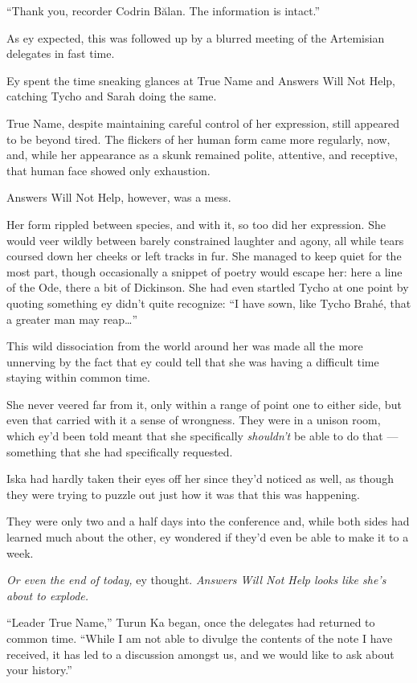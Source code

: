 ``Thank you, recorder Codrin Bălan. The information is intact.''

As ey expected, this was followed up by a blurred meeting of the Artemisian delegates in fast time.

Ey spent the time sneaking glances at True Name and Answers Will Not Help, catching Tycho and Sarah doing the same.

True Name, despite maintaining careful control of her expression, still appeared to be beyond tired. The flickers of her human form came more regularly, now, and, while her appearance as a skunk remained polite, attentive, and receptive, that human face showed only exhaustion.

Answers Will Not Help, however, was a mess.

Her form rippled between species, and with it, so too did her expression. She would veer wildly between barely constrained laughter and agony, all while tears coursed down her cheeks or left tracks in fur. She managed to keep quiet for the most part, though occasionally a snippet of poetry would escape her: here a line of the Ode, there a bit of Dickinson. She had even startled Tycho at one point by quoting something ey didn't quite recognize: ``I have sown, like Tycho Brahé, that a greater man may reap\ldots{}''

This wild dissociation from the world around her was made all the more unnerving by the fact that ey could tell that she was having a difficult time staying within common time.

She never veered far from it, only within a range of point one to either side, but even that carried with it a sense of wrongness. They were in a unison room, which ey'd been told meant that she specifically \emph{shouldn't} be able to do that — something that she had specifically requested.

Iska had hardly taken their eyes off her since they'd noticed as well, as though they were trying to puzzle out just how it was that this was happening.

They were only two and a half days into the conference and, while both sides had learned much about the other, ey wondered if they'd even be able to make it to a week.

\emph{Or even the end of today,} ey thought. \emph{Answers Will Not Help looks like she's about to explode.}

``Leader True Name,'' Turun Ka began, once the delegates had returned to common time. ``While I am not able to divulge the contents of the note I have received, it has led to a discussion amongst us, and we would like to ask about your history.''

